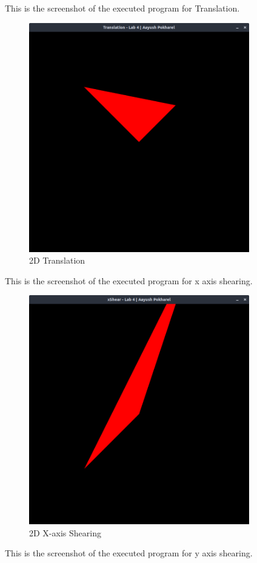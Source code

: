 \documentclass[12pt]{article}
\begin{document}
\clearpage
This is the screenshot of the executed program for Translation.
\begin{figure}[h]
    \centerline{\includegraphics[height=100mm]{2dTranslation.png}}
    \caption{2D Translation}
    \label{fig}
\end{figure}
\clearpage
This is the screenshot of the executed program for x axis shearing.
\begin{figure}[h]
    \centerline{\includegraphics[height=100mm]{2dxShear.png}}
    \caption{2D X-axis Shearing}
    \label{fig}
\end{figure}
\clearpage
This is the screenshot of the executed program for y axis shearing.
\end{document}
